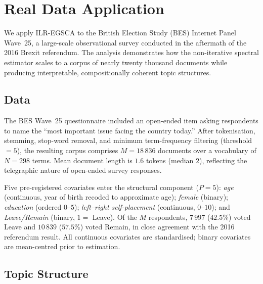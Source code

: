 \section{Real Data Application}
\label{sec:application}

We apply ILR-EGSCA to the British Election Study (BES) Internet Panel
Wave~25, a large-scale observational survey conducted in the aftermath of
the 2016 Brexit referendum.  The analysis demonstrates how the non-iterative
spectral estimator scales to a corpus of nearly twenty thousand documents
while producing interpretable, compositionally coherent topic structures.

\subsection{Data}
\label{subsec:data}

The BES Wave~25 questionnaire included an open-ended item asking
respondents to name the ``most important issue facing the country today.''
After tokenisation, stemming, stop-word removal, and minimum term-frequency
filtering (threshold~$= 5$), the resulting corpus comprises $M = 18\,836$
documents over a vocabulary of $N = 298$ terms.  Mean document length is
$1.6$ tokens (median $2$), reflecting the telegraphic nature of
open-ended survey responses.

Five pre-registered covariates enter the structural component
($P = 5$): \emph{age} (continuous, year of birth recoded to approximate
age); \emph{female} (binary); \emph{education} (ordered $0$--$5$);
\emph{left--right self-placement} (continuous, $0$--$10$); and
\emph{Leave/Remain} (binary, $1 =$ Leave).
Of the $M$ respondents, $7\,997$ ($42.5\%$) voted Leave and $10\,839$
($57.5\%$) voted Remain, in close agreement with the 2016 referendum
result.  All continuous covariates are standardised; binary covariates
are mean-centred prior to estimation.

\subsection{Topic Structure}
\label{subsec:topics}


